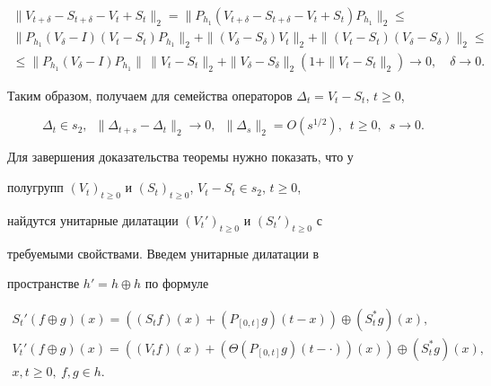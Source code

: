 \begin{multline*}


\|V_{t+\delta}-S_{t+\delta}-V_t+S_t\|_2=


\|P_{h_1}(V_{t+\delta}-S_{t+\delta}-V_t+S_t)P_{h_1}\|_2\leq \\


%


\|P_{h_1}(V_{\delta}-I)(V_t-S_t)P_{h_1}\|_2+


\|(V_{\delta}-S_{\delta})V_t\|_2+\|(V_t-S_t)(V_{\delta}-S_{\delta})\|_2\leq\\


%


\le\|P_{h_1}(V_{\delta}-I)P_{h_1}\|\,


\|V_t-S_t\|_2+\|V_{\delta}-S_{\delta}\|_2


(1+\|V_t-S_t\|_2)\to 0,\quad \delta \to 0.


\end{multline*}





Таким образом, получаем для семейства операторов $\Delta_t=


V_t-S_t$, $t\geq 0$,


\begin{equation}


\Delta_t\in s_2,\ \; \|\Delta_{t+s}-\Delta_t\|_2\to 0,\ \;


\|\Delta_s\|_2=O(s^{1/2}),\ \; t\geq 0,\ \; s\to 0.


\end{equation}





Для завершения доказательства теоремы нужно показать, что у


полугрупп $(V_t)_{t\geq 0}$ и $(S_t)_{t\geq 0}$, $V_t-S_t\in s_2$, $t\ge0$,


найдутся унитарные дилатации $(V_t')_{t\geq 0}$ и $(S_t')_{t\geq 0}$ с


требуемыми свойствами. Введем унитарные дилатации в


пространстве $h'=h\oplus h$ по формуле


\begin{gather*}


S_t'(f\oplus g)(x)=((S_tf)(x)+(P_{[0,t]}g)(t-x))\oplus (S_t^*g)(x), \\


%


V_t'(f\oplus g)(x)=((V_tf)(x)+(\Theta (P_{[0,t]}g)(t-\cdot))(x))\oplus


(S_t^*g)(x), \\


%


x,t\geq 0,\ f,g\in h.


\end{gather*}


